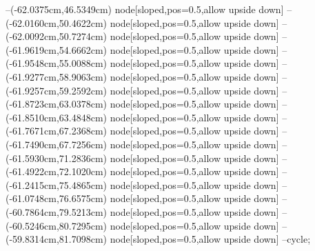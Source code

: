 --(-62.0375cm,46.5349cm) node[sloped,pos=0.5,allow upside down]{\arrowIn}
--(-62.0160cm,50.4622cm) node[sloped,pos=0.5,allow upside down]{\ArrowIn}
--(-62.0092cm,50.7274cm) node[sloped,pos=0.5,allow upside down]{\arrowIn}
--(-61.9619cm,54.6662cm) node[sloped,pos=0.5,allow upside down]{\ArrowIn}
--(-61.9548cm,55.0088cm) node[sloped,pos=0.5,allow upside down]{\arrowIn}
--(-61.9277cm,58.9063cm) node[sloped,pos=0.5,allow upside down]{\ArrowIn}
--(-61.9257cm,59.2592cm) node[sloped,pos=0.5,allow upside down]{\arrowIn}
--(-61.8723cm,63.0378cm) node[sloped,pos=0.5,allow upside down]{\ArrowIn}
--(-61.8510cm,63.4848cm) node[sloped,pos=0.5,allow upside down]{\arrowIn}
--(-61.7671cm,67.2368cm) node[sloped,pos=0.5,allow upside down]{\ArrowIn}
--(-61.7490cm,67.7256cm) node[sloped,pos=0.5,allow upside down]{\arrowIn}
--(-61.5930cm,71.2836cm) node[sloped,pos=0.5,allow upside down]{\ArrowIn}
--(-61.4922cm,72.1020cm) node[sloped,pos=0.5,allow upside down]{\arrowIn}
--(-61.2415cm,75.4865cm) node[sloped,pos=0.5,allow upside down]{\ArrowIn}
--(-61.0748cm,76.6575cm) node[sloped,pos=0.5,allow upside down]{\ArrowIn}
--(-60.7864cm,79.5213cm) node[sloped,pos=0.5,allow upside down]{\ArrowIn}
--(-60.5246cm,80.7295cm) node[sloped,pos=0.5,allow upside down]{\ArrowIn}
--(-59.8314cm,81.7098cm) node[sloped,pos=0.5,allow upside down]{\ArrowIn}
--cycle;
